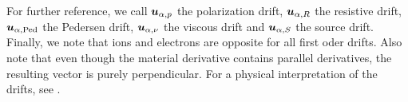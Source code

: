%
For further reference, we call $\boldsymbol{u}_{\alpha,p}$ the polarization drift, $\boldsymbol{u}_{\alpha,R}$ the resistive drift, $\boldsymbol{u}_{\alpha,\text{Ped}}$ the Pedersen drift, $\boldsymbol{u}_{\alpha,\nu}$ the viscous drift and $\boldsymbol{u}_{\alpha,S}$ the source drift.
Finally, we note that ions and electrons are opposite for all first oder drifts.
Also note that even though the material derivative contains parallel derivatives, the resulting vector is purely perpendicular.
For a physical interpretation of the drifts, see \cite{Garcia2003}.
